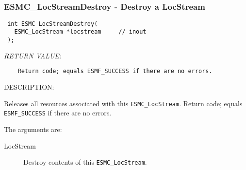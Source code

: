  
\mbox{}\hrulefill\ 
 
\subsubsection [ESMC\_LocStreamDestroy] {ESMC\_LocStreamDestroy - Destroy a LocStream}


  
\begin{verbatim} int ESMC_LocStreamDestroy(
   ESMC_LocStream *locstream     // inout
 );
 \end{verbatim}{\em RETURN VALUE:}
\begin{verbatim}    Return code; equals ESMF_SUCCESS if there are no errors.\end{verbatim}
{\sf DESCRIPTION:\\ }


  
    Releases all resources associated with this {\tt ESMC\_LocStream}.
      Return code; equals {\tt ESMF\_SUCCESS} if there are no errors.
  
    The arguments are:
    \begin{description}
    \item[LocStream]
      Destroy contents of this {\tt ESMC\_LocStream}.
    \end{description}
  
\setlength{\parskip}{\oldparskip}
\setlength{\parindent}{\oldparindent}
\setlength{\baselineskip}{\oldbaselineskip}
